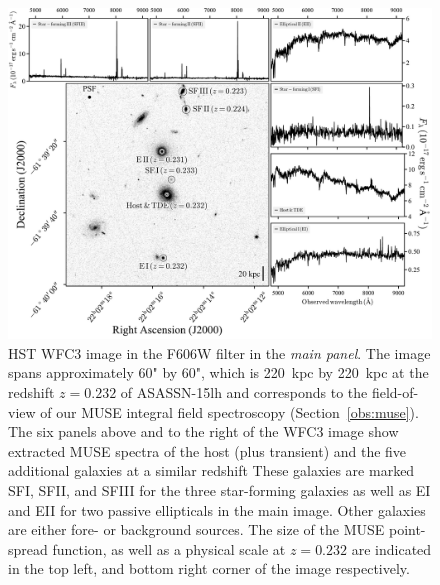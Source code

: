 \documentclass[traditabstract]{aa}
\begin{document}
\begin{figure}
  \includegraphics[width=0.999\linewidth]{fig/MUSE_ASASSN-15lh_wfc.pdf}
\caption{HST WFC3 image in the F606W filter in the \textit{main panel}. The image spans approximately 60" by 60", which is 220~kpc by 220~kpc at the redshift $z=0.232$ of ASASSN-15lh and corresponds to the field-of-view of our MUSE integral field spectroscopy (Section~\ref{obs:muse}). The six panels above and to the right of the WFC3 image show extracted MUSE spectra of the host (plus transient) and the five additional galaxies at a similar redshift These galaxies are marked SFI, SFII, and SFIII for the three star-forming galaxies as well as EI and EII for two passive ellipticals in the main image. Other galaxies are either fore- or background sources. The size of the MUSE point-spread function, as well as a physical scale at $z=0.232$ are indicated in the top left, and bottom right corner of the image respectively.}
\label{fig:fc}
\end{figure}
\end{document}
